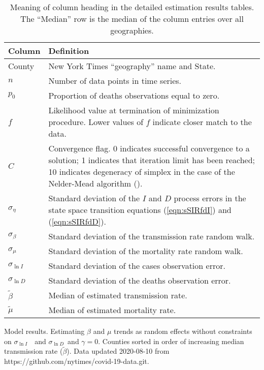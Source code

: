 \documentclass[12pt,letterpaper]{article}
\newcommand\slI{$\sigma_{\ln I}$\ }
\newcommand\slD{$\sigma_{\ln D}$}
\begin{document}
{\begin{appendices}
\begin{table}[!ht]
\caption{\label{tab:colheads}
Meaning of column heading in the detailed estimation results tables.
The ``Median'' row is the median of the column entries over all
geographies.
}
\begin{tabularx}{\textwidth}{ l X }
\hline
Column & Definition\\
\hline
County & New York Times ``geography'' name and State.\\
$n$ & Number of data points in time series.\\
$p_0$ &  Proportion of deaths observations equal to zero.\\
$f$ & Likelihood value at termination of minimization
procedure. Lower values of $f$ indicate closer match to the data.\\
$C$ & Convergence flag. 0 indicates successful convergence to a
solution; 1 indicates that iteration limit has been reached; 10
indicates degeneracy of simplex in the case of the Nelder-Mead
algorithm (\cite{Baudin2010}).\\
$\sigma_\eta$ & Standard deviation of the $I$ and $D$ process errors
in the state space transition equations (\ref{eqn:sSIRfdI}) and
(\ref{eqn:sSIRfdD}).\\
$\sigma_\beta$ & Standard deviation of the transmission rate random
walk.\\
$\sigma_\mu$ & Standard deviation of the mortality rate random walk.\\
$\sigma_{\ln I}$ & Standard deviation of the cases observation error.\\
$\sigma_{\ln D}$ & Standard deviation of the deaths observation error.\\
$\tilde{\beta}$ & Median of estimated transmission rate.\\
$\tilde{\mu}$ & Median of estimated mortality rate.\\
\hline

\end{tabularx}

\end{table}


\begin{sidewaystable}
\caption{\label{tab:uncons}
Model results. Estimating $\beta$ and $\mu$ trends as random effects
without constraints on  \slI\ and \slD\ and $\gamma = 0$.
Counties sorted in order of increasing median transmission rate ($\tilde\beta$).
Data updated 2020-08-10 from https://github.com/nytimes/covid-19-data.git.
}
\centering
{\scriptsize

}
\end{sidewaystable}
\end{appendices}}
\end{document}
